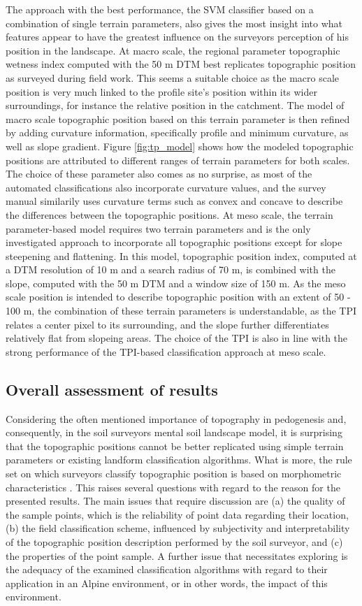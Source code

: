\documentclass[preprint,12pt,authoryear]{elsarticle}
\begin{document}
The approach with the best performance, the SVM classifier based on a combination of single terrain parameters, also gives the most insight into what features appear to have the greatest influence on the surveyors perception of his position in the landscape. At macro scale, the regional parameter topographic wetness index computed with the 50 m DTM best replicates topographic position as surveyed during field work. This seems a suitable choice as the macro scale position is very much linked to the profile site's position within its wider surroundings, for instance the relative position in the catchment. The model of macro scale topographic position based on this terrain parameter is then refined by adding curvature information, specifically profile and minimum curvature, as well as slope gradient. Figure \ref{fig:tp_model} shows how the modeled topographic positions are attributed to different ranges of terrain parameters for both scales. The choice of these parameter also comes as no surprise, as most of the automated classifications also incorporate curvature values, and the survey manual similarily uses curvature terms such as convex and concave to describe the differences between the topographic positions. At meso scale, the terrain parameter-based model requires two terrain parameters and is the only investigated approach to incorporate all topographic positions except for slope steepening and flattening. In this model, topographic position index, computed at a DTM resolution of 10 m and a search radius of 70 m, is combined with the slope, computed with the 50 m DTM and a window size of 150 m. As the meso scale position is intended to describe topographic position with an extent of 50 - 100 m, the combination of these terrain parameters is understandable, as the TPI relates a center pixel to its surrounding, and the slope further differentiates relatively flat from slopeing areas. The choice of the TPI is also in line with the strong performance of the TPI-based classification approach at meso scale.
\subsection{Overall assessment of results}
Considering the often mentioned importance of topography in pedogenesis and, consequently, in the soil surveyors mental soil landscape model, it is surprising that the topographic positions cannot be better replicated using simple terrain parameters or existing landform classification algorithms. What is more, the rule set on which surveyors classify topographic position is based on morphometric characteristics \citep{Englisch1998}. This raises several questions with regard to the reason for the presented results. The main issues that require discussion are (a) the quality of the sample points, which is the reliability of point data regarding their location, (b) the field classification scheme, influenced by subjectivity and interpretability of the topographic position description performed by the soil surveyor, and (c) the properties of the point sample. A further issue that necessitates exploring is the adequacy of the examined classification algorithms with regard to their application in an Alpine environment, or in other words, the impact of this environment. 
\end{document}
